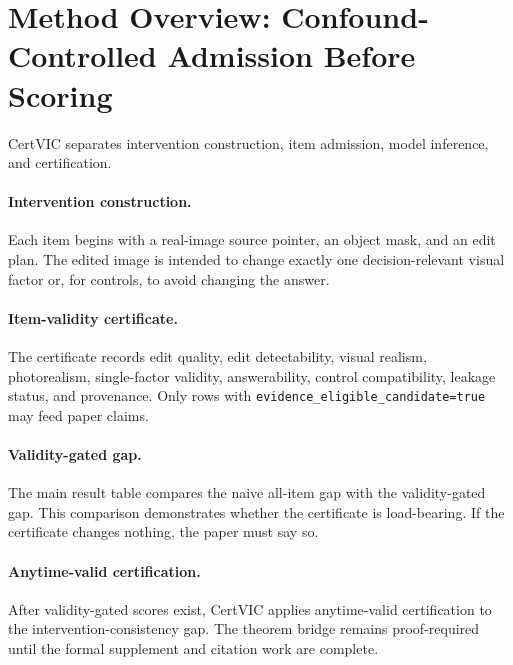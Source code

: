\section{Method Overview: Confound-Controlled Admission Before Scoring}

CertVIC separates intervention construction, item admission, model inference,
and certification.

\paragraph{Intervention construction.}
Each item begins with a real-image source pointer, an object mask, and an edit
plan. The edited image is intended to change exactly one decision-relevant visual
factor or, for controls, to avoid changing the answer.

\paragraph{Item-validity certificate.}
The certificate records edit quality, edit detectability, visual realism,
photorealism, single-factor validity, answerability, control compatibility,
leakage status, and provenance. Only rows with
\texttt{evidence\_eligible\_candidate=true} may feed paper claims.

\paragraph{Validity-gated gap.}
The main result table compares the naive all-item gap with the validity-gated
gap. This comparison demonstrates whether the certificate is load-bearing. If
the certificate changes nothing, the paper must say so.

\paragraph{Anytime-valid certification.}
After validity-gated scores exist, CertVIC applies anytime-valid certification to
the intervention-consistency gap. The theorem bridge remains proof-required
until the formal supplement and citation work are complete.
